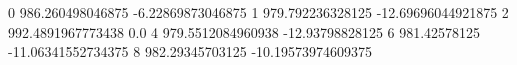 0 986.260498046875 -6.22869873046875
1 979.792236328125 -12.69696044921875
2 992.4891967773438 0.0
4 979.5512084960938 -12.93798828125
6 981.42578125 -11.06341552734375
8 982.29345703125 -10.19573974609375
